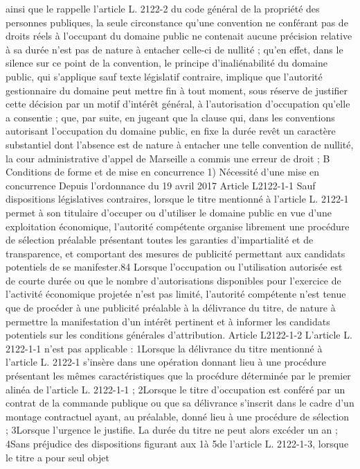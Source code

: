 \documentclass[11pt,a4paper]{report}
\begin{document}
ainsi que le rappelle l'article L. 2122-2 du code général de la propriété des personnes publiques, la seule
circonstance qu'une convention ne conférant pas de droits réels à l'occupant du domaine public ne contenait
aucune précision relative à sa durée n'est pas de nature à entacher celle-ci de nullité ; qu'en effet, dans le
silence sur ce point de la convention, le principe d'inaliénabilité du domaine public, qui s'applique sauf texte
législatif contraire, implique que l'autorité gestionnaire du domaine peut mettre fin à tout moment, sous réserve
de justifier cette décision par un motif d'intérêt général, à l'autorisation d'occupation qu'elle a consentie ; que,
par suite, en jugeant que la clause qui, dans les conventions autorisant l'occupation du domaine public, en fixe
la durée revêt un caractère substantiel dont l'absence est de nature à entacher une telle convention de nullité, la
cour administrative d'appel de Marseille a commis une erreur de droit ;
B Conditions de forme et de mise en concurrence
1) Nécessité d’une mise en concurrence
Depuis l’ordonnance du 19 avril 2017
Article L2122-1-1
Sauf dispositions législatives contraires, lorsque le titre mentionné à l'article L. 2122-1 permet à son titulaire
d'occuper ou d'utiliser le domaine public en vue d'une exploitation économique, l'autorité compétente organise
librement une procédure de sélection préalable présentant toutes les garanties d'impartialité et de transparence,
et comportant des mesures de publicité permettant aux candidats potentiels de se manifester.84
Lorsque l'occupation ou l'utilisation autorisée est de courte durée ou que le nombre d'autorisations disponibles
pour l'exercice de l'activité économique projetée n'est pas limité, l'autorité compétente n'est tenue que de
procéder à une publicité préalable à la délivrance du titre, de nature à permettre la manifestation d'un intérêt
pertinent et à informer les candidats potentiels sur les conditions générales d'attribution.
Article L2122-1-2
L'article L. 2122-1-1 n'est pas applicable :
1\degre  Lorsque la délivrance du titre mentionné à l'article L. 2122-1 s'insère dans une opération donnant lieu à une
procédure présentant les mêmes caractéristiques que la procédure déterminée par le premier alinéa de l'article
L. 2122-1-1 ;
2\degre  Lorsque le titre d'occupation est conféré par un contrat de la commande publique ou que sa délivrance
s'inscrit dans le cadre d'un montage contractuel ayant, au préalable, donné lieu à une procédure de sélection ;
3\degre  Lorsque l'urgence le justifie. La durée du titre ne peut alors excéder un an ;
4\degre  Sans préjudice des dispositions figurant aux 1\degre  à 5\degre  de l'article L. 2122-1-3, lorsque le titre a pour seul objet
\end{document}
